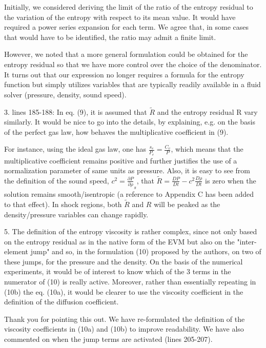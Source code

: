 \documentclass{article}
\begin{document}
Initially, we considered deriving the limit of the ratio of the entropy residual to the variation of the entropy with respect to its mean value.  It would have required a power series expansion for each term. We agree that, in some cases that would have to be identified, the ratio may admit a finite limit.

However, we noted that a more general formulation could be obtained for the entropy residual so that we have more control over the choice of the denominator. It turns out that our expression no longer requires a formula for the entropy function but simply utilizes variables that are typically readily available in a fluid solver (pressure, density, sound speed). %
\bigskip


{
\color{blue}
3. lines 185-188: In eq. (9), it is assumed that $\tilde{R}$ and the entropy residual R vary similarly. It would be nice to go into the details, by explaining, e.g. on the basis of the perfect gas law, how behaves the multiplicative coefficient in (9). 
}

For instance, using the ideal gas law, one has $\frac{s_e}{P_e} = \frac{C_v}{P}$,  which means that the multiplicative coefficient remains positive and further justifies the use of a normalization parameter of same units as pressure. Also, it is easy to see from the definition of the sound speed, $c^2 = \frac{\partial P}{\partial \rho}_s$, that $\tilde{R} = \frac{DP}{Dt}-c^2 \frac{D\rho}{Dt}$ is zero when the solution remains smooth/isentropic (a reference to Appendix C has been added to that effect). In shock regions, both $\tilde{R}$ and $R$ will be peaked as the density/pressure variables can change rapidly.
\bigskip


{
\color{blue}
5. The definition of the entropy viscosity is rather complex, since not only based on  the entropy residual as in the native form of the EVM but also on  the "inter-element jump" and so, in the formulation (10) proposed by the authors, on two of these jumps, for the pressure and the density. On the basis of the numerical experiments, it  would be of interest to know which of the 3 terms in the numerator of (10) is really active.  Moreover, rather than essentially repeating in (10b) the eq. (10a), it would be clearer to use the viscosity coefficient in the definition of the diffusion coefficient.
}

Thank you for pointing this out. We have re-formulated the definition of the viscosity coefficients in (10a) and (10b) to improve readability. We have also commented on when the jump terms are activated (lines 205-207).
\bigskip
\end{document}
